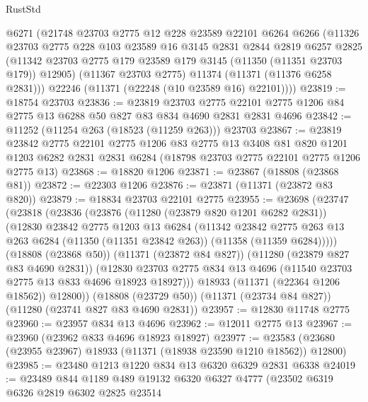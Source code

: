 \begin{lexlean}{RustStd}
\begin{coremodule}
      @6271
      (@21748
        @23703
        @2775
        @12
        @228
        @23589
        @22101
        @6264
        @6266
        (@11326
          @23703
          @2775
          @228
          @103
          @23589
          @16
          @3145
          @2831
          @2844
          @2819
          @6257
          @2825
          (@11342 @23703 @2775 @179 @23589 @179 @3145 (@11350 (@11351 @23703 @179)) @12905)
          (@11367 @23703 @2775)
          @11374
          (@11371 (@11376 @6258 @2831)))
        @22246
        (@11371 (@22248 (@10 @23589 @16) @22101))))
@23819 := @18754 @23703
@23836 := @23819
    @23703
    @2775
    @22101
    @2775
    @1206
    @84
    @2775
    @13
    @6288
    @50
    @827
    @83
    @834
    @4690
    @2831
    @2831
    @4696
@23842 := @11252 (@11254 @263 (@18523 (@11259 @263))) @23703
@23867 := @23819
    @23842
    @2775
    @22101
    @2775
    @1206
    @83
    @2775
    @13
    @3408
    @81
    @820
    @1201
    @1203
    @6282
    @2831
    @2831
    @6284
    (@18798 @23703 @2775 @22101 @2775 @1206 @2775 @13)
@23868 := @18820 @1206
@23871 := @23867 (@18808 (@23868 @81))
@23872 := @22303 @1206
@23876 := @23871 (@11371 (@23872 @83 @820))
@23879 := @18834 @23703 @22101 @2775
@23955 := @23698
    (@23747
      (@23818
        (@23836
          (@23876
            (@11280 (@23879 @820 @1201 @6282 @2831))
            (@12830
              @23842
              @2775
              @1203
              @13
              @6284
              (@11342
                @23842
                @2775
                @263
                @13
                @263
                @6284
                (@11350 (@11351 @23842 @263))
                (@11358 (@11359 @6284)))))
          (@18808 (@23868 @50))
          (@11371 (@23872 @84 @827))
          (@11280 (@23879 @827 @83 @4690 @2831))
          (@12830 @23703 @2775 @834 @13 @4696 (@11540 @23703 @2775 @13 @833 @4696 @18923 @18927)))
        @18933
        (@11371 (@22364 @1206 @18562))
        @12800))
    (@18808 (@23729 @50))
    (@11371 (@23734 @84 @827))
    (@11280 (@23741 @827 @83 @4690 @2831))
@23957 := @12830 @11748 @2775
@23960 := @23957 @834 @13 @4696
@23962 := @12011 @2775 @13
@23967 := @23960 (@23962 @833 @4696 @18923 @18927)
@23977 := @23583 (@23680 (@23955 @23967) @18933 (@11371 (@18938 @23590 @1210 @18562)) @12800)
@23985 := @23480 @1213 @1220 @834 @13 @6320 @6329 @2831 @6338
@24019 := @23489
    @844
    @1189
    @489
    @19132
    @6320
    @6327
    @4777
    (@23502
      @6319
      @6326
      @2819
      @6302
      @2825
      @23514

\end{coremodule}
\end{lexlean}

